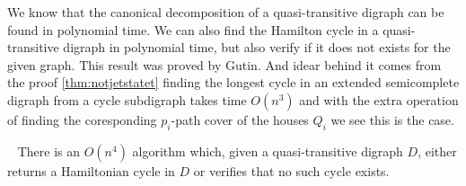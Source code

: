 We know that the canonical decomposition of a quasi-transitive digraph can be found in polynomial time. 
We can also find the Hamilton cycle in a quasi-transitive digraph in polynomial time, but also verify if it does not exists for the given graph. This result was proved by Gutin. And idear behind it comes from the proof \autoref{thm:notjetstatet} finding the longest cycle in an extended semicomplete digraph from a cycle subdigraph takes time $O(n^3)$ and with the extra operation of finding the coresponding $p_i$-path cover of the houses $Q_i$ we see this is the case.

\begin{thm}~\cite{banggutin94}
    There is an $O(n^4)$ algorithm which, given a quasi-transitive digraph $D$, either returns a Hamiltonian cycle in $D$ or verifies that no such cycle exists.
\end{thm}




